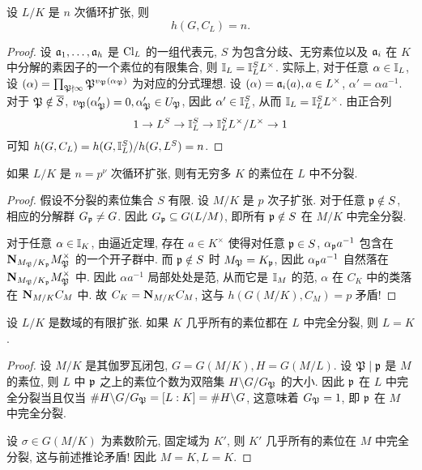 \begin{theorem}{}{}
设 $L/K$ 是 $n$ 次循环扩张, 则
  \[h(G,C_L)=n.\]
\end{theorem}
\begin{proof}
设 ${\mathfrak{a}}_1,\dots,{\mathfrak{a}}_h$ 是 ${\mathrm{Cl}}_L$ 的一组代表元, $S$ 为包含分歧、无穷素位以及 ${\mathfrak{a}}_i$ 在 $K$ 中分解的素因子的一个素位的有限集合, 则 ${\mathbb{I}}_L={\mathbb{I}}_L^S L^\times$. 实际上, 对于任意 $\alpha\in {\mathbb{I}}_L$, 设 $(\alpha)=\prod_{{\mathfrak{P}}\nmid\infty}{\mathfrak{P}}^{v_{\mathfrak{P}}(\alpha_{\mathfrak{P}})}$ 为对应的分式理想. 设 $(\alpha)={\mathfrak{a}}_i(a),a\in L^\times$, $\alpha'=\alpha a^{-1}$. 对于 ${\mathfrak{P}}\notin \overline S$, $v_{\mathfrak{P}}(\alpha'_{\mathfrak{P}})=0,\alpha'_{\mathfrak{P}}\in U_{\mathfrak{P}}$, 因此 $\alpha'\in {\mathbb{I}}_L^S$, 从而 ${\mathbb{I}}_L={\mathbb{I}}_L^S L^\times$.
由正合列
  \[1\rightarrow L^S\rightarrow {\mathbb{I}}_L^S\rightarrow {\mathbb{I}}_L^SL^\times/L^\times\rightarrow 1\]
可知 $h(G,C_L)=h(G,{\mathbb{I}}_L^S)/h(G,L^S)=n$.
\end{proof}

\begin{corollary}{}{}
如果 $L/K$ 是 $n=p^\nu$ 次循环扩张, 则有无穷多 $K$ 的素位在 $L$ 中不分裂.
\end{corollary}
\begin{proof}
假设不分裂的素位集合 $S$ 有限. 设 $M/K$ 是 $p$ 次子扩张. 对于任意 ${\mathfrak{p}}\notin S$, 相应的分解群 $G_{\mathfrak{p}}\neq G$. 因此 $G_{\mathfrak{p}}\subseteq G(L/M)$, 即所有 ${\mathfrak{p}}\notin S$ 在 $M/K$ 中完全分裂.

对于任意 $\alpha\in{\mathbb{I}}_K$, 由逼近定理, 存在 $a\in K^\times$ 使得对任意 ${\mathfrak{p}}\in S$, $\alpha_{\mathfrak{p}} a^{-1}$ 包含在 ${\mathbf{N}}_{M_{\mathfrak{P}}/K_{\mathfrak{p}}}M_{\mathfrak{P}}^\times$ 的一个开子群中. 而 ${\mathfrak{p}}\notin S$ 时 $M_{\mathfrak{P}}=K_{\mathfrak{p}}$, 因此 $\alpha_{\mathfrak{p}} a^{-1}$ 自然落在 ${\mathbf{N}}_{M_{\mathfrak{P}}/K_{\mathfrak{p}}}M_{\mathfrak{P}}^\times$ 中. 因此 $\alpha a^{-1}$ 局部处处是范, 从而它是 ${\mathbb{I}}_M$ 的范, $\alpha$ 在 $C_K$ 中的类落在 ${\mathbf{N}}_{M/K}C_M$ 中. 故 $C_K={\mathbf{N}}_{M/K}C_M$, 这与 $h(G(M/K),C_M)=p$ 矛盾!
\end{proof}

\begin{corollary}{}{}
设 $L/K$ 是数域的有限扩张. 如果 $K$ 几乎所有的素位都在 $L$ 中完全分裂, 则 $L=K$.
\end{corollary}
\begin{proof}
设 $M/K$ 是其伽罗瓦闭包, $G=G(M/K),H=G(M/L)$. 设 ${\mathfrak{P}}\mid{\mathfrak{p}}$ 是 $M$ 的素位, 则 $L$ 中 ${\mathfrak{p}}$ 之上的素位个数为双陪集 $H\backslash G/ G_{\mathfrak{P}}$ 的大小. 因此 ${\mathfrak{p}}$ 在 $L$ 中完全分裂当且仅当 $\# H\backslash G/G_{\mathfrak{P}}=[L:K]=\# H\backslash G$, 这意味着 $G_{\mathfrak{P}}=1$, 即 ${\mathfrak{p}}$ 在 $M$ 中完全分裂.

设 $\sigma\in G(M/K)$ 为素数阶元, 固定域为 $K'$, 则 $K'$ 几乎所有的素位在 $M$ 中完全分裂, 这与前述推论矛盾! 因此 $M=K,L=K$.
\end{proof}


